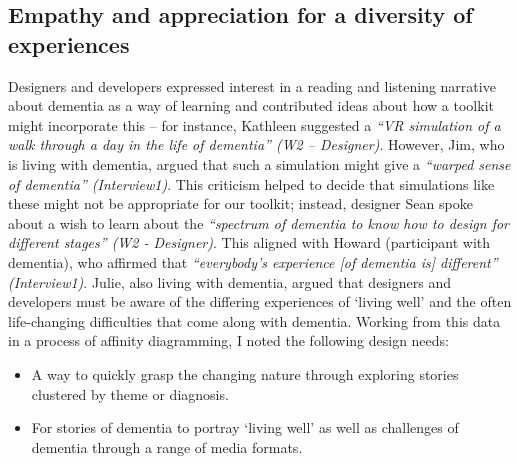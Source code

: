 \subsection{Empathy and appreciation for a diversity of experiences}
Designers and developers expressed interest in a reading and listening narrative about dementia as a way of learning and contributed ideas about how a toolkit might incorporate this – for instance, Kathleen suggested a \textit{``VR simulation of a walk through a day in the life of dementia'' (W2 – Designer)}. However, Jim, who is living with dementia, argued that such a simulation might give a \textit{``warped sense of dementia'' (Interview1)}. This criticism helped to decide that simulations like these might not be appropriate for our toolkit; instead, designer Sean spoke about a wish to learn about the \textit{``spectrum of dementia to know how to design for different stages'' (W2 - Designer)}. This aligned with Howard (participant with dementia), who affirmed that \textit{``everybody’s experience [of dementia is] different'' (Interview1)}. Julie, also living with dementia, argued that designers and developers must be aware of the differing experiences of `living well' and the often life-changing difficulties that come along with dementia. Working from this data in a process of affinity diagramming, I noted the following design needs:
\begin{itemize}
    \item A way to quickly grasp the changing nature through exploring stories clustered by theme or diagnosis.
    \item For stories of dementia to portray `living well' as well as challenges of dementia through a range of media formats.
\end{itemize}

